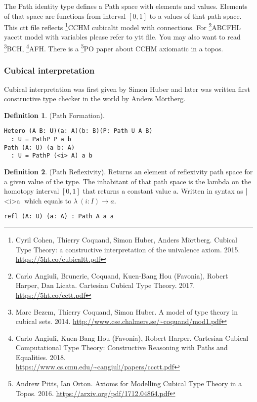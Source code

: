 \documentclass[twocolumn,10pt]{article}
\theoremstyle{definition}
\newtheorem{definition}{Definition}
\begin{document}
The Path identity type defines a Path space with elements and values.
Elements of that space are functions from interval $[0,1]$ to a values of that path space.
This ctt file reflects \footnote{Cyril Cohen, Thierry Coquand, Simon Huber, Anders M{\"{o}}rtberg. Cubical Type Theory: a constructive interpretation of the univalence axiom. 2015. \url{https://5ht.co/cubicaltt.pdf}}{CCHM} cubicaltt model with connections.
For \footnote{Carlo Angiuli, Brunerie, Coquand, Kuen-Bang Hou (Favonia), Robert Harper, Dan Licata. Cartesian Cubical Type Theory. 2017. \url{https://5ht.co/cctt.pdf}}{ABCFHL} yacctt model with
variables please refer to ytt file. You may also want to
read \footnote{Marc Bezem, Thierry Coquand, Simon Huber. A model of type theory in cubical sets. 2014. \url{http://www.cse.chalmers.se/~coquand/mod1.pdf}}{BCH},
\footnote{Carlo Angiuli, Kuen-Bang Hou (Favonia), Robert Harper. Cartesian Cubical Computational Type Theory: Constructive Reasoning with Paths and Equalities. 2018. \\ \url{https://www.cs.cmu.edu/~cangiuli/papers/ccctt.pdf}}{AFH}.
There is a \footnote{Andrew Pitts, Ian Orton. Axioms for Modelling Cubical Type Theory in a Topos. 2016. \url{https://arxiv.org/pdf/1712.04864.pdf}}{PO} paper about CCHM axiomatic in a topos.

\subsubsection*{Cubical interpretation}

Cubical interpretation was first given by Simon Huber\cite{Huber16} and later was
written first constructive type checker in the world by Anders M{\"{o}}rtberg\cite{Mortberg17}.

\begin{definition} (Path Formation).
\begin{lstlisting}
Hetero (A B: U)(a: A)(b: B)(P: Path U A B)
  : U = PathP P a b
Path (A: U) (a b: A)
  : U = PathP (<i> A) a b
\end{lstlisting}
\end{definition}

\begin{definition} (Path Reflexivity).
Returns an element of reflexivity path space for a given value of the type.
The inhabitant of that path space is the lambda on the homotopy
interval $[0,1]$ that returns a constant value a. Written in
syntax as |<i>a| which equals to $\lambda\ (i: I) \rightarrow a$.
\begin{lstlisting}
refl (A: U) (a: A) : Path A a a
\end{lstlisting}
\end{definition}
\end{document}
